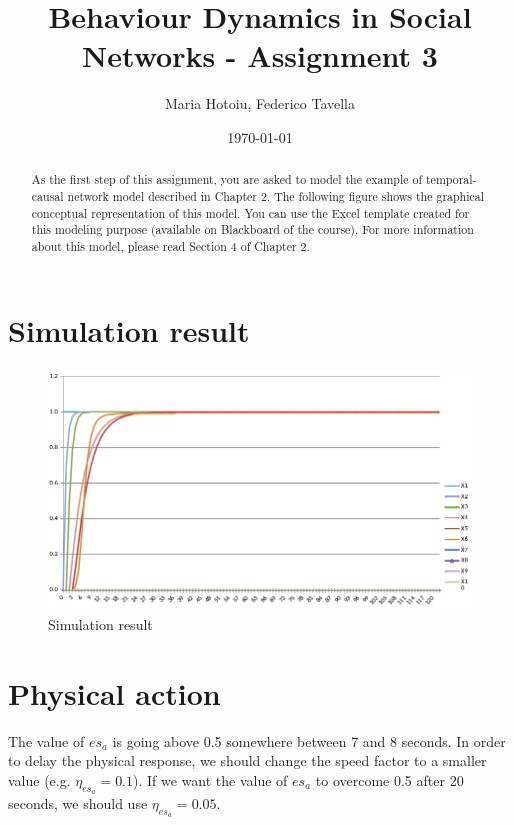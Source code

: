 \documentclass[a4paper]{article}
\title{Behaviour Dynamics in Social Networks - Assignment 3}
\author{Maria Hotoiu, Federico Tavella}
\date{\today}
\begin{document}
\maketitle

\begin{abstract}
As the first step of this assignment, you are asked to model the example of temporal-causal network
model described in Chapter 2. The following figure shows the graphical conceptual representation of
this model. You can use the Excel template created for this modeling purpose (available on Blackboard
of the course). For more information about this model, please read Section 4 of Chapter 2.
\end{abstract}

\section{Simulation result}

\begin{figure}[!htpb]
\center
\includegraphics[width=\textwidth]{res/img/results}
\caption{Simulation result}
\label{fig:simulation_result}
\end{figure}

\section{Physical action}

The value of $es_a$ is going above 0.5 somewhere between 7 and 8 seconds. In order to delay the physical response, we should change the speed factor to a smaller value (e.g. $\eta_{es_{a}} = 0.1$). If we want the value of $es_{a}$ to overcome 0.5 after 20 seconds, we should use $\eta_{es_{a}} = 0.05$.
\end{document}
